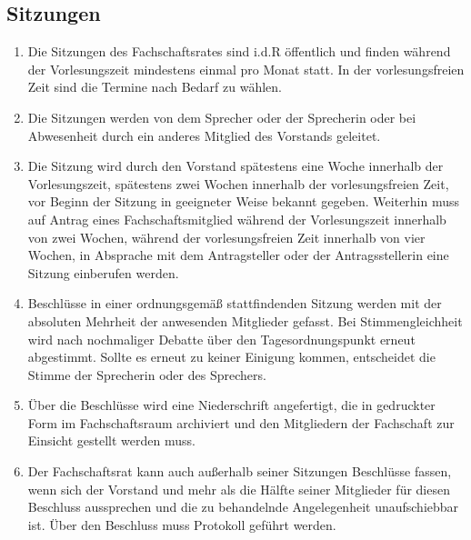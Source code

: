 \subsection{Sitzungen}
\begin{enumerate}
\item Die Sitzungen des Fachschaftsrates sind i.d.R öffentlich und finden während der Vorlesungszeit mindestens einmal pro Monat statt. In der vorlesungsfreien Zeit sind die Termine nach Bedarf zu wählen.
\item Die Sitzungen werden von dem Sprecher oder der Sprecherin oder bei Abwesenheit durch ein anderes Mitglied des Vorstands geleitet.
\item Die Sitzung wird durch den Vorstand spätestens eine Woche innerhalb der Vorlesungszeit, spätestens zwei Wochen innerhalb der vorlesungsfreien Zeit, vor Beginn der Sitzung in geeigneter Weise bekannt gegeben. Weiterhin muss auf Antrag eines Fachschaftsmitglied während der Vorlesungszeit innerhalb von zwei Wochen, während der vorlesungsfreien Zeit innerhalb von vier Wochen, in Absprache mit dem Antragsteller oder der Antragsstellerin eine Sitzung einberufen werden.
\item Beschlüsse in einer ordnungsgemäß stattfindenden Sitzung werden mit der absoluten Mehrheit der anwesenden Mitglieder gefasst. Bei Stimmengleichheit wird nach nochmaliger Debatte über den Tagesordnungspunkt erneut abgestimmt. Sollte es erneut zu keiner Einigung kommen, entscheidet die Stimme der Sprecherin oder des Sprechers.
\item Über die Beschlüsse wird eine Niederschrift angefertigt, die in gedruckter Form im Fachschaftsraum archiviert und den Mitgliedern der Fachschaft zur Einsicht gestellt werden muss.
\item Der Fachschaftsrat kann auch außerhalb seiner Sitzungen Beschlüsse fassen, wenn sich der Vorstand und mehr als die Hälfte seiner Mitglieder für diesen Beschluss aussprechen und die zu behandelnde Angelegenheit unaufschiebbar ist. Über den Beschluss muss Protokoll geführt werden.
\end{enumerate}
